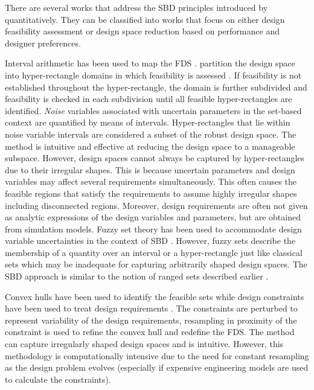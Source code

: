 There are several works that address the \ac{SBD} principles introduced by \citeauthor{SobekIi1999} quantitatively. They can be classified into works that focus on either design feasibility assessment or design space reduction based on performance and designer preferences.

Interval arithmetic has been used to map the \ac{FDS} \cite{Qureshi2014, Nahm2005}. \citeauthor{Qureshi2014} partition the design space into hyper-rectangle domains in which feasibility is assessed \cite{Qureshi2014}. If feasibility is not established throughout the hyper-rectangle, the domain is further subdivided and feasibility is checked in each subdivision until all feasible hyper-rectangles are identified. \textit{Noise} variables associated with uncertain parameters in the set-based context are quantified by means of intervals. Hyper-rectangles that lie within noise variable intervals are considered a subset of the robust design space. The method is intuitive and effective at reducing the design space to a manageable subspace. However, design spaces cannot always be captured by hyper-rectangles due to their irregular shapes. This is because uncertain parameters and design variables may affect several requirements simultaneously. This often causes the feasible regions that satisfy the requirements to assume highly irregular shapes including disconnected regions. Moreover, design requirements are often not given as analytic expressions of the design variables and parameters, but are obtained from simulation models. Fuzzy set theory has been used to accommodate design variable uncertainties in the context of \ac{SBD} \cite{Gventer1999}. However, fuzzy sets describe the membership of a quantity over an interval or a hyper-rectangle just like classical sets which may be inadequate for capturing arbitrarily shaped design spaces. The \ac{SBD} approach is similar to the notion of ranged sets described earlier \cite{Liu2008}.

Convex hulls have been used to identify the feasible sets while design constraints have been used to treat design requirements \cite{Kizer2014}. The constraints are perturbed to represent variability of the design requirements, resampling in proximity of the constraint is used to refine the convex hull and redefine the \ac{FDS}. The method can capture irregularly shaped design spaces and is intuitive. However, this methodology is computationally intensive due to the need for constant resampling as the design problem evolves (especially if expensive engineering models are used to calculate the constraints).

